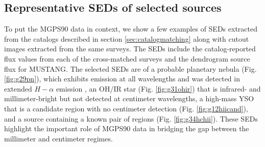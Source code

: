 \documentclass[twocolumn]{aastex62}
\def\todo#1{{\textcolor{red}{TODO: #1}}}
\newcommand{\MGPS}{MGPS90\xspace}
\begin{document}
\subsection{Representative SEDs of selected sources}
To put the \MGPS data in context, we show a few examples of SEDs extracted
from the catalogs described in section \ref{sec:catalogmatching} along with
cutout images extracted from the same surveys.  The SEDs include the
catalog-reported flux values from each of the cross-matched surveys and the
dendrogram source flux for MUSTANG.  The selected SEDs are of a probable
planetary nebula (Fig. \ref{fig:g29pn}), which exhibits emission at all
wavelengths and was detected in extended $H-\alpha$ emission
\citep{Sabin2014a}, an OH/IR star (Fig. \ref{fig:g31ohir}) that is infrared-
and millimeter-bright but not detected at centimeter wavelengths, a high-mass
YSO that is a candidate \hchii region with no centimeter detection (Fig.
\ref{fig:g12hiicand}), and a source containing a known pair of \hchii regions
(Fig.  \ref{fig:g34hchii}).  These SEDs highlight the important role of \MGPS
data in bridging the gap between the millimeter and centimeter regimes.

\end{document}
